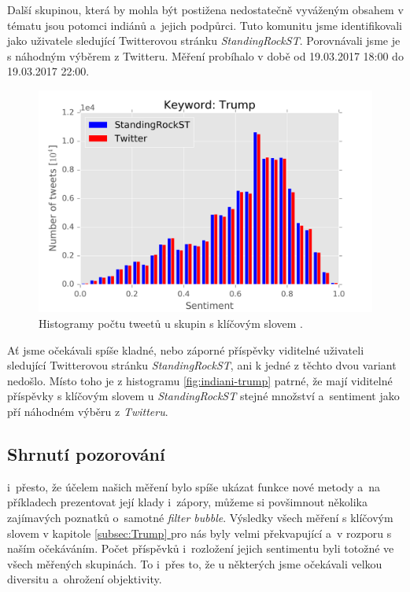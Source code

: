 \documentclass[12pt, a4paper]{article}
\newcommand*{\fullref}[1]{\hyperref[{#1}]{\ref*{#1} \nameref*{#1}}} %
\numberwithin{equation}{section} 	%
\begin{document}
Další skupinou, která by mohla být postižena nedostatečně vyváženým obsahem v tématu \textit{} jsou potomci indiánů a~jejich podpůrci. Tuto komunitu jsme identifikovali jako uživatele sledující Twitterovou stránku \textit{StandingRockST}. Porovnávali jsme je s náhodným výběrem z Twitteru. Měření probíhalo v době od 19.03.2017 18:00 do 19.03.2017 22:00.
\begin{figure}[h]
\centering
\includegraphics[scale=0.5]{./Pics/indiani-trump.png}
\caption{Histogramy počtu tweetů u skupin s klíčovým slovem \textit{}.}
\label{fig:indiani-trump}
\end{figure}

Ať jsme očekávali spíše kladné, nebo záporné příspěvky viditelné uživateli sledující Twitterovou stránku \textit{StandingRockST}, ani k jedné z těchto dvou variant nedošlo. Místo toho je z histogramu \autoref{fig:indiani-trump} patrné, že mají viditelné příspěvky s klíčovým slovem \textit{} u \textit{StandingRockST} stejné množství a~sentiment jako pří náhodném výběru z \textit{Twitteru}.

\subsection{Shrnutí pozorování}
\noindent i~přesto, že účelem našich měření bylo spíše ukázat funkce nové metody a~na příkladech prezentovat její klady i~zápory, můžeme si povšimnout několika za\-jí\-ma\-vých poznatků o~samotné \textit{filter bubble}. Výsledky všech měření s klíčovým slovem \textit{} v kapitole \fullref{subsec:Trump} pro nás byly velmi překvapující a~v rozporu s naším očekáváním. Počet příspěvků i~rozložení jejich sentimentu byli totožné ve všech měřených skupinách. To i~přes to, že u některých jsme očekávali velkou diversitu a~ohrožení objektivity.
\end{document}
